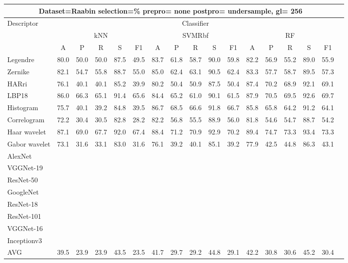 \documentclass[12pt,italian]{article}
\begin{document}
\begin{tiny}
\begin{longtable}{lcccccccccccccccc}
\toprule
\multicolumn{16}{c}{Dataset=Raabin selection=\% prepro= none postpro= undersample, gl= 256} \\ 
\toprule
Descriptor & \multicolumn{15}{c}{Classifier} \\ 
& \multicolumn{5}{c}{kNN} & \multicolumn{5}{c}{SVMRbf} & \multicolumn{5}{c}{RF} \\ 
& A & P & R & S & F1 & A & P & R & S & F1 & A & P & R & S & F1 \\ 
\midrule
Legendre & 80.0 & 50.0 & 50.0 & 87.5 & 49.5 & 83.7 & 61.8 & 58.7 & 90.0 & 59.8 & 82.2 & 56.9 & 55.2 & 89.0 & 55.9 \\ 
Zernike & 82.1 & 54.7 & 55.8 & 88.7 & 55.0 & 85.0 & 62.4 & 63.1 & 90.5 & 62.4 & 83.3 & 57.7 & 58.7 & 89.5 & 57.3 \\ 
HARri & 76.1 & 40.1 & 40.1 & 85.2 & 39.9 & 80.2 & 50.4 & 50.9 & 87.5 & 50.4 & 87.4 & 70.2 & 68.9 & 92.1 & 69.1 \\ 
LBP18 & 86.0 & 66.3 & 65.1 & 91.4 & 65.6 & 84.4 & 65.2 & 61.0 & 90.1 & 61.5 & 87.9 & 70.5 & 69.5 & 92.6 & 69.7 \\ 
Histogram & 75.7 & 40.1 & 39.2 & 84.8 & 39.5 & 86.7 & 68.5 & 66.6 & 91.8 & 66.7 & 85.8 & 65.8 & 64.2 & 91.2 & 64.1 \\ 
Correlogram & 72.2 & 30.4 & 30.5 & 82.8 & 28.2 & 82.2 & 56.8 & 55.5 & 88.9 & 56.0 & 81.8 & 54.6 & 54.7 & 88.7 & 54.2 \\ 
Haar wavelet & 87.1 & 69.0 & 67.7 & 92.0 & 67.4 & 88.4 & 71.2 & 70.9 & 92.9 & 70.2 & 89.4 & 74.7 & 73.3 & 93.4 & 73.3 \\ 
Gabor wavelet & 73.1 & 31.6 & 33.1 & 83.0 & 31.6 & 76.1 & 39.2 & 40.1 & 85.1 & 39.2 & 77.9 & 42.5 & 44.8 & 86.3 & 43.1 \\ 
AlexNet \\ 
VGGNet-19 \\ 
ResNet-50 \\ 
GoogleNet \\ 
ResNet-18 \\ 
ResNet-101 \\ 
VGGNet-16 \\ 
Inceptionv3 \\ 
\hline
AVG & 39.5 & 23.9 & 23.9 & 43.5 & 23.5 & 41.7 & 29.7 & 29.2 & 44.8 & 29.1 & 42.2 & 30.8 & 30.6 & 45.2 & 30.4 \\ 
\hline
\bottomrule
\end{longtable} 


\end{tiny}
\end{document}
